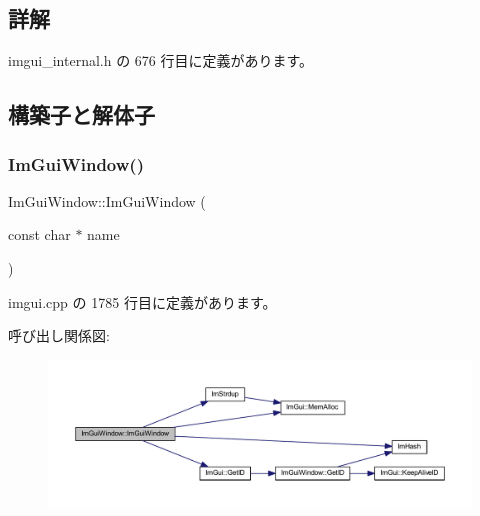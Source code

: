 \subsection{詳解}


 imgui\+\_\+internal.\+h の 676 行目に定義があります。



\subsection{構築子と解体子}
\mbox{\label{struct_im_gui_window_abbc943558e96c8895237f0b55a66751b}} 
\subsubsection{\texorpdfstring{Im\+Gui\+Window()}{ImGuiWindow()}}
{\footnotesize\ttfamily Im\+Gui\+Window\+::\+Im\+Gui\+Window (\begin{DoxyParamCaption}\item[{const char $\ast$}]{name }\end{DoxyParamCaption})}



 imgui.\+cpp の 1785 行目に定義があります。

呼び出し関係図\+:\nopagebreak
\begin{figure}[H]
\begin{center}
\leavevmode
\includegraphics[width=350pt]{struct_im_gui_window_abbc943558e96c8895237f0b55a66751b_cgraph}
\end{center}
\end{figure}
\mbox{\label{struct_im_gui_window_a8e81d730c3a39a71e6b6ca4654451c53}} 

